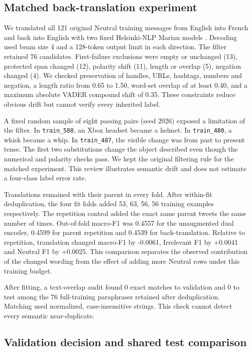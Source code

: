 \subsection{Matched back-translation experiment}

We translated all 121 original Neutral training messages from English into French and back into English with two fixed Helsinki-NLP Marian models \cite{opus}. Decoding used beam size 4 and a 128-token output limit in each direction. The filter retained 76 candidates. First-failure exclusions were empty or unchanged (13), protected span changed (12), polarity shift (11), length or overlap (5), negation changed (4). We checked preservation of handles, URLs, hashtags, numbers and negation, a length ratio from 0.65 to 1.50, word-set overlap of at least 0.40, and a maximum absolute VADER compound shift of 0.35. These constraints reduce obvious drift but cannot verify every inherited label.

A fixed random sample of eight passing pairs (seed 2026) exposed a limitation of the filter. In \texttt{train\_580}, an Xbox headset became a helmet. In \texttt{train\_480}, a whisk became a whip. In \texttt{train\_487}, the visible change was from past to present tense. The first two substitutions change the object described even though the numerical and polarity checks pass. We kept the original filtering rule for the matched experiment. This review illustrates semantic drift and does not estimate a four-class label error rate.

Translations remained with their parent in every fold. After within-fit deduplication, the four fit folds added 53, 63, 56, 56 training examples respectively. The repetition control added the exact same parent tweets the same number of times. Out-of-fold macro-F1 was 0.4557 for the unaugmented dual encoder, 0.4599 for parent repetition and 0.4539 for back-translation. Relative to repetition, translation changed macro-F1 by -0.0061, Irrelevant F1 by +0.0041 and Neutral F1 by +0.0025. This comparison separates the observed contribution of the changed wording from the effect of adding more Neutral rows under this training budget.

After fitting, a text-overlap audit found 0 exact matches to validation and 0 to test among the 76 full-training paraphrases retained after deduplication. Matching used normalized, case-insensitive strings. This check cannot detect every semantic near-duplicate.

\subsection{Validation decision and shared test comparison}

